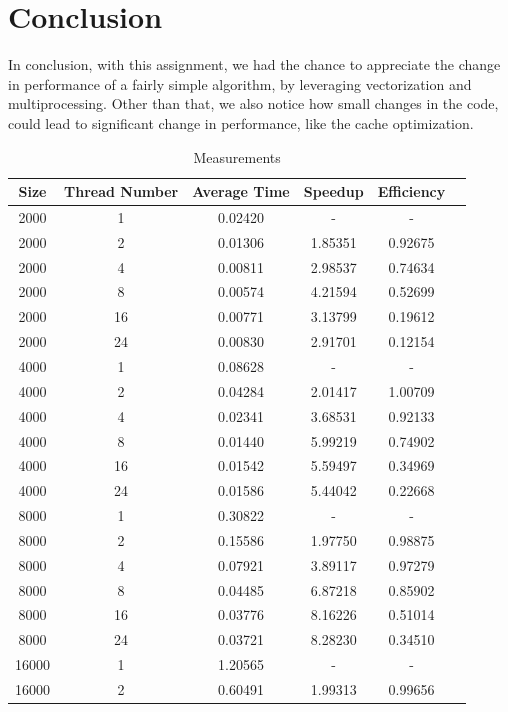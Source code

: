 \documentclass{article}
\begin{document}
\section{Conclusion}
In conclusion, with this assignment, we had the chance to appreciate the change in performance of a fairly simple algorithm, by leveraging vectorization and multiprocessing. Other than that, we also notice how small changes in the code, could lead to significant change in performance, like the cache optimization.

\begin{table}[htbp]
  \centering
  \caption{Measurements}
    \begin{tabular}{cccccc}
    \toprule
    Size     & Thread Number & Average Time & Speedup & Efficiency \\
    \midrule
    2000  & 1     & 0.02420 & - & - \\
    2000  & 2     & 0.01306 & 1.85351 & 0.92675 \\
    2000  & 4     & 0.00811 & 2.98537 & 0.74634 \\
    2000  & 8     & 0.00574 & 4.21594 & 0.52699 \\
    2000  & 16    & 0.00771 & 3.13799 & 0.19612 \\
    2000  & 24    & 0.00830 & 2.91701 & 0.12154 \\
        \midrule
    4000  & 1     & 0.08628 & - & - \\
    4000  & 2     & 0.04284 & 2.01417 & 1.00709 \\
    4000  & 4     & 0.02341 & 3.68531 & 0.92133 \\
    4000  & 8     & 0.01440 & 5.99219 & 0.74902 \\
    4000  & 16    & 0.01542 & 5.59497 & 0.34969 \\
    4000  & 24    & 0.01586 & 5.44042 & 0.22668 \\
        \midrule
    8000  & 1     & 0.30822 & - & - \\
    8000  & 2     & 0.15586 & 1.97750 & 0.98875 \\
    8000  & 4     & 0.07921 & 3.89117 & 0.97279 \\
    8000  & 8     & 0.04485 & 6.87218 & 0.85902 \\
    8000  & 16    & 0.03776 & 8.16226 & 0.51014 \\
    8000  & 24    & 0.03721 & 8.28230 & 0.34510 \\
        \midrule
    16000 & 1     & 1.20565 & - & - \\
    16000 & 2     & 0.60491 & 1.99313 & 0.99656 \\

\end{tabular}
\end{table}
\end{document}

